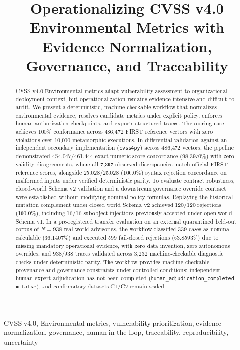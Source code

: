 \documentclass[conference]{IEEEtran}
\title{Operationalizing CVSS v4.0 Environmental Metrics with
Evidence Normalization, Governance, and Traceability}
\author{
\IEEEauthorblockN{Anonymous Author(s)}
\IEEEauthorblockA{Affiliation withheld for double-blind review}
}
\begin{document}
\maketitle

\begin{abstract}
CVSS v4.0 Environmental metrics adapt vulnerability assessment to organizational deployment context, but operationalization remains evidence-intensive and difficult to audit. We present a deterministic, machine-checkable workflow that normalizes environmental evidence, resolves candidate metrics under explicit policy, enforces human authorization checkpoints, and exports structured traces. The scoring core achieves 100\% conformance across 486,472 FIRST reference vectors with zero violations over 10,000 metamorphic executions. In differential validation against an independent secondary implementation (\texttt{cvss4py}) across 486,472 vectors, the pipeline demonstrated 454,047/461,444 exact numeric score concordance (98.3970\%) with zero validity disagreements, where all 7,397 observed discrepancies match official FIRST reference scores, alongside 25,028/25,028 (100.0\%) syntax rejection concordance on malformed inputs under verified deterministic parity. To evaluate contract robustness, closed-world Schema v2 validation and a downstream governance override contract were established without modifying nominal policy formulas. Replaying the historical mutation complement under closed-world Schema v2 achieved 120/120 rejections (100.0\%), including 16/16 subobject injections previously accepted under open-world Schema v1. In a pre-registered transfer evaluation on an external quarantined held-out corpus of $N=938$ real-world advisories, the workflow classified 339 cases as nominal-calculable (36.1407\%) and executed 599 fail-closed rejections (63.8593\%) due to missing mandatory operational evidence, with zero data invention, zero autonomous overrides, and 938/938 traces validated across 3,232 machine-checkable diagnostic checks under deterministic parity. The workflow provides machine-checkable provenance and governance constraints under controlled conditions; independent human expert adjudication has not been completed (\texttt{human\_adjudication\_completed = false}), and confirmatory datasets C1/C2 remain sealed.
\end{abstract}

\begin{IEEEkeywords}
CVSS v4.0, Environmental metrics, vulnerability prioritization,
evidence normalization, governance, human-in-the-loop, traceability,
reproducibility, uncertainty
\end{IEEEkeywords}
\end{document}
